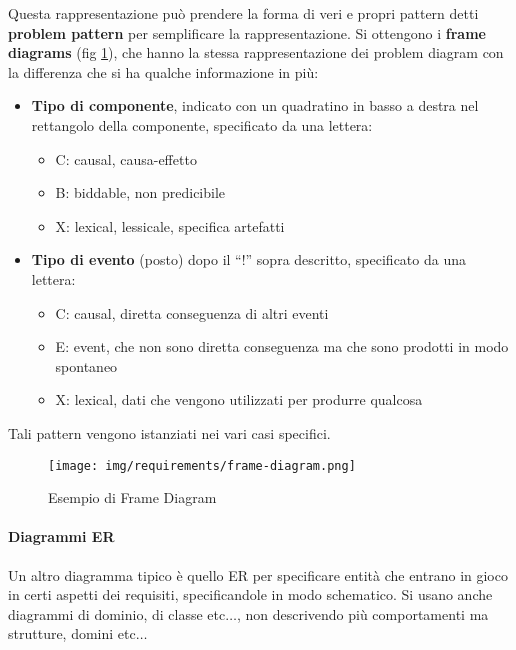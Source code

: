 Questa rappresentazione può prendere la forma di veri e propri pattern detti
\textbf{problem pattern} per semplificare la rappresentazione. Si ottengono i
\textbf{frame diagrams} (fig \ref{fig:frame-diagram}), che hanno la stessa
rappresentazione dei problem diagram con la differenza che si ha qualche informazione in più:
\begin{itemize}
      \item \textbf{Tipo di componente}, indicato con un quadratino in basso a
            destra nel rettangolo della componente, specificato da una lettera:
            \begin{itemize}
                  \item C: causal, causa-effetto
                  \item B: biddable, non predicibile
                  \item X: lexical, lessicale, specifica artefatti
            \end{itemize}
      \item \textbf{Tipo di evento} (posto) dopo il “!” sopra descritto, specificato
            da una lettera:
            \begin{itemize}
                  \item C: causal, diretta conseguenza di altri eventi
                  \item E: event, che non sono diretta conseguenza ma che sono prodotti
                        in modo spontaneo
                  \item X: lexical, dati che vengono utilizzati per produrre qualcosa
            \end{itemize}
\end{itemize}
Tali pattern vengono istanziati nei vari casi specifici.

\begin{figure}[!ht]
      \centering
      \texttt{[image: img/requirements/frame-diagram.png]}
      \caption{Esempio di Frame Diagram}
      \label{fig:frame-diagram}
\end{figure}
\paragraph{Diagrammi ER}
Un altro diagramma tipico è quello ER per specificare entità che entrano in gioco
in certi aspetti dei requisiti, specificandole in modo schematico. Si usano anche
diagrammi di dominio, di classe etc$\dots$, non descrivendo più comportamenti
ma strutture, domini etc$\dots$
